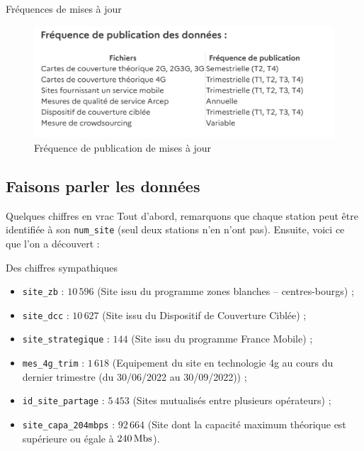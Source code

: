 \begin{frame}{Fréquences de mises à jour}
    \begin{figure}
        \includegraphics[height=0.5\paperheight]{images/frequence.png}
        \caption{\label{fig:freq}Fréquence de publication de mises à jour}
    \end{figure}
\end{frame}


\subsection{Faisons parler les données}
\insertsubsectionframe

\begin{frame}{Quelques chiffres en vrac}
    Tout d'abord, remarquons que chaque station peut être identifiée à son \texttt{num\_site} (seul deux stations n'en n'ont pas).
    Ensuite, voici ce que l'on a découvert :
    \begin{block}{Des chiffres sympathiques}
        \begin{itemize}
            \item \texttt{site\_zb} : $10\,596$ (Site issu du programme \og zones blanches – centres-bourgs\fg{}) ;
            \item \texttt{site\_dcc} : $10\,627$ (Site issu du \og Dispositif de Couverture Ciblée\fg{}) ;
            \item \texttt{site\_strategique} : $144$ (Site issu du programme \og France Mobile\fg{}) ;
            \item \texttt{mes\_4g\_trim} : $1\,618$ (Equipement du site en technologie 4g au cours du dernier trimestre (du 30/06/2022 au 30/09/2022)) ;
            \item \texttt{id\_site\_partage} : $5\,453$ (Sites mutualisés entre plusieurs opérateurs) ;
            \item \texttt{site\_capa\_204mbps} : $92\,664$ (Site dont la capacité maximum théorique est supérieure ou égale à $\unit[240]{Mbs}$).
        \end{itemize}
    \end{block}
\end{frame}

